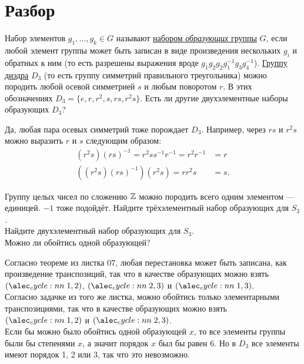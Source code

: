 \documentclass[a4paper,12pt]{article}
\begin{document}
    
    \section{Разбор}
    
     Набор элементов $g_1, \ldots, g_k \in G$ называют \href{https://ru.wikipedia.org/wiki/\%D0\%9F\%D0\%BE\%D1\%80\%D0\%BE\%D0\%B6\%D0\%B4\%D0\%B0\%D1\%8E\%D1\%89\%D0\%B5\%D0\%B5_\%D0\%BC\%D0\%BD\%D0\%BE\%D0\%B6\%D0\%B5\%D1\%81\%D1\%82\%D0\%B2\%D0\%BE_\%D0\%B3\%D1\%80\%D1\%83\%D0\%BF\%D0\%BF\%D1\%8B}{набором \emph{образующих} группы} $G$, если любой элемент группы может быть записан в виде произведения нескольких $g_i$ и обратных к ним (то есть разрешены выражения вроде $g_1g_2g_2g_1^{-1}g_3g_4^{-1}$).
    \example \href{https://ru.wikipedia.org/wiki/\%D0\%94\%D0\%B8\%D1\%8D\%D0\%B4\%D1\%80\%D0\%B0\%D0\%BB\%D1\%8C\%D0\%BD\%D0\%B0\%D1\%8F_\%D0\%B3\%D1\%80\%D1\%83\%D0\%BF\%D0\%BF\%D0\%B0}{Группу диэдра} $D_3$ (то есть группу симметрий правильного треугольника) можно породить любой осевой симметрией $s$ и любым поворотом $r$. В этих обозначениях $D_3 = \{e, r, r^2, s, rs, r^2s\}$.
    \problem Есть ли другие двухэлементные наборы образующих $D_3$?
\begin{solution}
    Да, любая пара осевых симметрий тоже порождает $D_3$. Например, через $rs$ и $r^2s$ можно выразить $r$ и $s$ следующим образом:
    \begin{align*}
        (r^2s)(rs)^{-1} = r^2ss^{-1}r^{-1} = r^2r^{-1} &= r \\
        ((r^2s)(rs)^{-1})(r^2s) = rr^2s &= s.
    \end{align*}
\end{solution}
    \example Группу целых чисел по сложению $\mathbb{Z}$ можно породить всего одним элементом --- единицей. $-1$ тоже подойдёт.
    \problem \sub Найдите трёхэлементный набор образующих для $S_3$. \\
    \sub Найдите двухэлементный набор образующих для $S_3$. \\
    \sub Можно ли обойтись одной образующей?
    \begin{solution}
        \sub Согласно теореме из листка 07, любая перестановка может быть записана, как произведение транспозиций, так что в качестве образующих можно взять $\cycle{1,2}$, $\cycle{2,3}$ и $\cycle{1,3}$. \\
        \sub Согласно задачке из того же листка, можно обойтись только элементарными транспозициями, так что в качестве образующих можно взять $\cycle{1,2}$ и $\cycle{2,3}$. \\
        \sub Если бы можно было обойтись одной образующей $x$, то все элементы группы были бы степенями $x$, а значит порядок $x$ был бы равен 6. Но в $D_3$ все элементы имеют порядок 1, 2 или 3, так что это невозможно.
    \end{solution}
\end{document}
